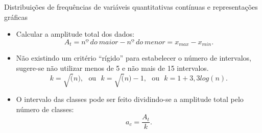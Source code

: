 \documentclass[
  ignorenonframetext,
]{beamer}
\begin{document}
\begin{frame}
\begin{block}{Distribuições de frequências de variáveis quantitativas
contínuas e representações gráficas}
\label{distribuiuxe7uxf5es-de-frequuxeancias-de-variuxe1veis-quantitativas-contuxednuas-e-representauxe7uxf5es-gruxe1ficas}
\begin{itemize}
\item
  Calcular a amplitude total dos dados:
  \[A_t=nº\ do\ maior - nº\ do\ menor = x_{max}-x_{min}.\]
\item
  Não existindo um critério ``rígido'' para estabelecer o número de
  intervalos, sugere-se não utilizar menos de 5 e não mais de 15
  intervalos.
  \[k=\sqrt(n),\ \ \ \mbox{ou}\ \ \ k=\sqrt(n)-1, \ \ \ \mbox{ou} \ \ \ k=1+3,3log(n).\]
\item
  O intervalo das classes pode ser feito dividindo-se a amplitude total
  pelo número de classes: \[a_c=\frac{A_t}{k}.\]
\end{itemize}
\end{block}
\end{frame}
\end{document}
